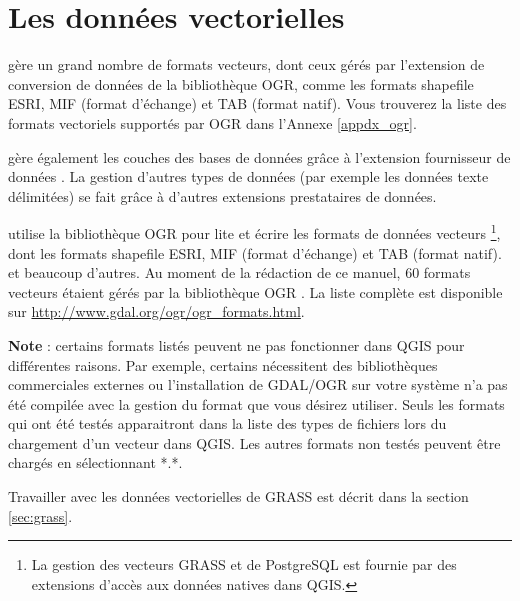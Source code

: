 
\chapter{Les données vectorielles}\label{label_workingvector}

\qg gère un grand nombre de formats vecteurs, dont ceux gérés par l'extension 
de conversion de données de la bibliothèque OGR, comme les formats shapefile 
ESRI, \map MIF 
(format d'échange) et  \map TAB 
(format natif).
Vous trouverez la liste des formats vectoriels supportés par OGR dans l'Annexe \ref{appdx_ogr}.

\qg gère également les couches \pg {} des 
bases de données \psq grâce à l'extension fournisseur de données \psq. La gestion 
d'autres types de données (par exemple les données texte délimitées) se fait 
grâce à d'autres extensions prestataires de données.

\qg utilise la bibliothèque OGR pour lite et écrire les formats de données 
vecteurs \footnote{La gestion des vecteurs GRASS et de PostgreSQL est fournie 
par des extensions d'accès aux données natives dans QGIS.}, dont les formats shapefile
ESRI, \map MIF
(format d'échange) et  \map TAB
(format natif). et beaucoup 
d'autres. Au moment de la rédaction de ce manuel, 60 formats vecteurs étaient 
gérés par la bibliothèque OGR \cite{OGRWeb}. La liste complète est disponible 
sur \url{http://www.gdal.org/ogr/ogr_formats.html}.

\textbf{Note} : certains formats listés peuvent ne pas fonctionner dans QGIS 
pour différentes raisons. Par exemple, certains nécessitent des bibliothèques 
commerciales externes ou l'installation de GDAL/OGR sur votre système n'a pas 
été compilée avec la gestion du format que vous désirez utiliser. Seuls les 
formats qui ont été testés apparaitront dans la liste des types de fichiers 
lors du chargement d'un vecteur dans QGIS. Les autres formats non testés 
peuvent être chargés en sélectionnant *.*. 

Travailler avec les données vectorielles de GRASS est décrit dans la section 
\ref{sec:grass}.

